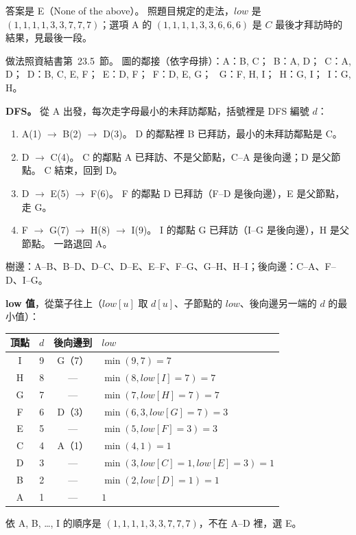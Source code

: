 \begin{pastsoln}
答案是 E（None of the above）。 照題目規定的走法，$\mathit{low}$ 是 $(1, 1, 1, 1, 3, 3, 7, 7, 7)$；選項 A 的 $(1, 1, 1, 1, 3, 3, 6, 6, 6)$
是 $C$ 最後才拜訪時的結果，見最後一段。

做法照資結書第~23.5~節。 圖的鄰接（依字母排）：A：B, C；\ B：A, D；\ C：A, D；\ D：B, C, E, F；\ E：D, F；\ F：D, E, G；
\ G：F, H, I；\ H：G, I；\ I：G, H。

\textbf{DFS。} 從 A 出發，每次走字母最小的未拜訪鄰點，括號裡是 DFS 編號 $d$：
\begin{enumerate}
\item A(1) $\to$ B(2) $\to$ D(3)。 D 的鄰點裡 B 已拜訪，最小的未拜訪鄰點是 C。
\item D $\to$ C(4)。 C 的鄰點 A 已拜訪、不是父節點，C--A 是後向邊；D 是父節點。 C 結束，回到 D。
\item D $\to$ E(5) $\to$ F(6)。 F 的鄰點 D 已拜訪（F--D 是後向邊），E 是父節點，走 G。
\item F $\to$ G(7) $\to$ H(8) $\to$ I(9)。 I 的鄰點 G 已拜訪（I--G 是後向邊），H 是父節點。 一路退回 A。
\end{enumerate}
樹邊：A--B、B--D、D--C、D--E、E--F、F--G、G--H、H--I；後向邊：C--A、F--D、I--G。

\textbf{low 值}，從葉子往上（$\mathit{low}[u]$ 取 $d[u]$、子節點的 $\mathit{low}$、後向邊另一端的 $d$ 的最小值）：
\begin{center}
\begin{tabular}{cccl}
\toprule
頂點 & $d$ & 後向邊到 & $\mathit{low}$ \\
\midrule
I & 9 & G（7） & $\min(9, 7) = 7$ \\
H & 8 & --- & $\min(8, \mathit{low}[I] = 7) = 7$ \\
G & 7 & --- & $\min(7, \mathit{low}[H] = 7) = 7$ \\
F & 6 & D（3） & $\min(6, 3, \mathit{low}[G] = 7) = 3$ \\
E & 5 & --- & $\min(5, \mathit{low}[F] = 3) = 3$ \\
C & 4 & A（1） & $\min(4, 1) = 1$ \\
D & 3 & --- & $\min(3, \mathit{low}[C] = 1, \mathit{low}[E] = 3) = 1$ \\
B & 2 & --- & $\min(2, \mathit{low}[D] = 1) = 1$ \\
A & 1 & --- & $1$ \\
\bottomrule
\end{tabular}
\end{center}
依 A, B, \ldots, I 的順序是 $(1, 1, 1, 1, 3, 3, 7, 7, 7)$，不在 A--D 裡，選 E。


\end{pastsoln}
